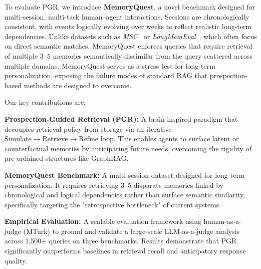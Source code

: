 To evaluate PGR, we introduce \textbf{MemoryQuest}, a novel benchmark designed for multi-session, multi-task human--agent interactions. Sessions are chronologically consistent, with events logically evolving over weeks to reflect realistic long-term dependencies. Unlike datasets such as \emph{MSC}~\cite{xu-etal-2022-beyond} or \emph{LongMemEval}~\cite{wu2024longmemevalbenchmarkingchatassistants}, which often focus on direct semantic matches, MemoryQuest enforces queries that require retrieval of multiple $3$--$5$ memories semantically dissimilar from the query scattered across multiple domains. MemoryQuest serves as a stress test for long-term personalization, exposing the failure modes of standard RAG that prospection-based methods are designed to overcome.

Our key contributions are:
\squishlist
\item \textbf{Prospection-Guided Retrieval (PGR):} A brain-inspired paradigm that decouples retrieval policy from storage via an iterative $\text{Simulate} \rightarrow \text{Retrieve} \rightarrow \text{Refine}$ loop. This enables agents to surface latent or counterfactual memories by anticipating future needs, overcoming the rigidity of pre-ordained structures like GraphRAG.
\item \textbf{MemoryQuest Benchmark:} A multi-session dataset designed for long-term personalization. It requires retrieving $3$--$5$ disparate memories linked by chronological and logical dependencies rather than surface semantic similarity, specifically targeting the "retrospective bottleneck" of current systems.
\item \textbf{Empirical Evaluation:} A scalable evaluation framework using human-as-a-judge (MTurk) to ground and validate a large-scale LLM-as-a-judge analysis across 1,500+ queries on three benchmarks. Results demonstrate that PGR significantly outperforms baselines in retrieval recall and anticipatory response quality.
\squishend

